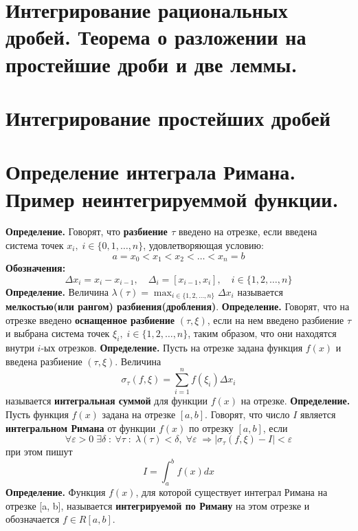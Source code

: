 \documentclass{article}
\newcommand*{\definition}[1]{\textbf{Определение.} #1 \newline}
\begin{document}
\section{Интегрирование рациональных дробей. Теорема о разложении на простейшие дроби и две леммы.}
\section{Интегрирование простейших дробей}
\section{Определение интеграла Римана. Пример неинтегрируеммой функции.}
\definition{ Говорят, что \textbf{разбиение $\tau$} введено на отрезке, если введена система точек $x_i, \; i \in \{0, 1, \dots, n\}$, удовлетворяющая условию: }
$$
    a = x_0 < x_1 < x_2 < \dots < x_n = b
$$
\textbf{Обозначения: }
$$
    \Delta x_i = x_i - x_{i-1}, \quad \Delta_i = [x_{i-1}, x_i], \quad i \in \{1, 2, \dots, n \}
$$
\definition{Величина $\lambda(\tau) = \displaystyle \max_{i \in \{1, 2, \dots, n \}} \Delta x_i$ называется \textbf{мелкостью(или рангом) разбиения(дробления)}.}
\newline
\definition{Говорят, что на отрезке введено \textbf{оснащенное разбиение} $(\tau, \xi)$, если на нем введено разбиение $\tau$ и выбрана система точек $\xi_i, \; i \in \{ 1, 2, \dots, n\}$, таким образом, что они находятся внутри $i$-ых отрезков.}
\newline
\definition{Пусть на отрезке задана функция $f(x)$ и введена разбиение $(\tau, \xi)$. Величина}
$$
    \sigma_\tau(f, \xi) = \sum_{i = 1}^{n} f(\xi_i) \Delta x_i
$$
называется \textbf{интегральная суммой} для функции $f(x)$ на отрезке.
\newline 
\newline 
\definition{Пусть функция $f(x)$ задана на отрезке $[a, b]$. Говорят, что число $I$ является \textbf{интегральном Римана} от функции $f(x)$ по отрезку $[a, b]$, если}
$$
    \forall \varepsilon > 0 \; \exists \delta \; : \: \forall \tau \; : \; \lambda(\tau) < \delta, \; \forall \varepsilon \; \Rightarrow |\sigma_\tau(f, \xi) - I| < \varepsilon
$$
при этом пишут 
$$
    I = \int_{a}^{b} f(x)dx
$$
\definition{Функция $f(x)$, для которой существует интеграл Римана на отрезке [a, b], называется \textbf{интегрируемой по Риману} на этом отрезке и обозначается $f \in R[a, b]$.}
\newline 
\end{document}

